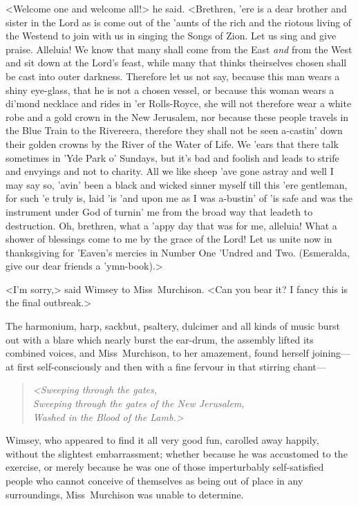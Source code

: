 <Welcome one and welcome all!> he said. <Brethren, 'ere is a dear brother and sister in the Lord as is come out of the 'aunts of the rich and the riotous living of the Westend to join with us in singing the Songs of Zion. Let us sing and give praise. Alleluia! We know that many shall come from the East \emph{and} from the West and sit down at the Lord's feast, while many that thinks theirselves chosen shall be cast into outer darkness. Therefore let us not say, because this man wears a shiny eye-glass, that he is not a chosen vessel, or because this woman wears a di'mond necklace and rides in 'er Rolls-Royce, she will not therefore wear a white robe and a gold crown in the New Jerusalem, nor because these people travels in the Blue Train to the Rivereera, therefore they shall not be seen a-castin' down their golden crowns by the River of the Water of Life. We 'ears that there talk sometimes in 'Yde Park o' Sundays, but it's bad and foolish and leads to strife and envyings and not to charity. All we like sheep 'ave gone astray and well I may say so, 'avin' been a black and wicked sinner myself till this 'ere gentleman, for such 'e truly is, laid 'is 'and upon me as I was a-bustin' of 'is safe and was the instrument under God of turnin' me from the broad way that leadeth to destruction. Oh, brethren, what a 'appy day that was for me, alleluia! What a shower of blessings come to me by the grace of the Lord! Let us unite now in thanksgiving for 'Eaven's mercies in Number One 'Undred and Two. (Esmeralda, give our dear friends a 'ymn-book).>

<I'm sorry,> said Wimsey to Miss~Murchison. <Can you bear it? I fancy this is the final outbreak.>

The harmonium, harp, sackbut, psaltery, dulcimer and all kinds of music burst out with a blare which nearly burst the ear-drum, the assembly lifted its combined voices, and Miss~Murchison, to her amazement, found herself joining—at first self-consciously and then with a fine fervour in that stirring chant—

\begin{verse}\itshape
	<Sweeping through the gates,\\
	Sweeping through the gates of the New Jerusalem,\\
	Washed in the Blood of the Lamb.>
\end{verse}

Wimsey, who appeared to find it all very good fun, carolled away happily, without the slightest embarrassment; whether because he was accustomed to the exercise, or merely because he was one of those imperturbably self-satisfied people who cannot conceive of themselves as being out of place in any surroundings, Miss~Murchison was unable to determine.

